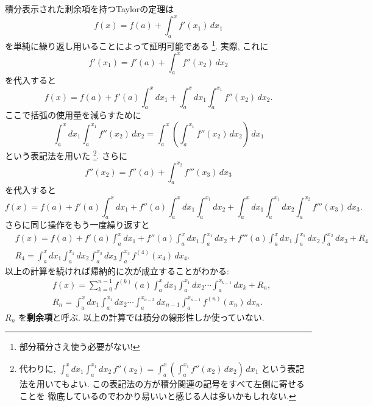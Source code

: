 \documentclass[12pt,twoside]{jarticle}
\theoremstyle{jplain}
\theoremstyle{jplain}
\theoremstyle{jplain}
\numberwithin{theorem}{section}
\numberwithin{equation}{section}
\numberwithin{figure}{section}
\numberwithin{table}{section}
\begin{document}
積分表示された剰余項を持つTaylorの定理は
\[
f(x)=f(a)+\int_a^x f'(x_1)\,dx_1
\]
を単純に繰り返し用いることによって証明可能である%
\footnote{部分積分さえ使う必要がない!}.
実際, これに
\[
f'(x_1)=f'(a)+\int_a^x f''(x_2)\,dx_2
\]
を代入すると
\[
f(x)=f(a)+f'(a) \int_a^x dx_1+\int_a^x dx_1\int_a^{x_1} f''(x_2)\,dx_2.
\]
ここで括弧の使用量を減らすために
\[
\int_a^x dx_1\int_a^{x_1} f''(x_2)\,dx_2
=\int_a^x \left(\int_a^{x_1} f''(x_2)\,dx_2 \right)\,dx_1
\]
という表記法を用いた%
\footnote{代わりに, 
\(\displaystyle
\int_a^x dx_1\int_a^{x_1}dx_2\, f''(x_2)
=\int_a^x \left(\int_a^{x_1} f''(x_2)\,dx_2 \right)\,dx_1
\)
という表記法を用いてもよい.
この表記法の方が積分関連の記号をすべて左側に寄せることを
徹底しているのでわかり易いいと感じる人は多いかもしれない.}.
さらに
\[
f''(x_2)=f''(a)+\int_a^{x_2} f'''(x_3)\,dx_3
\]
を代入すると
\[
f(x)=f(a)+f'(a)\int_a^x\!\!\!dx_1+f''(a)\int_a^x\!\!\!dx_1\int_a^{x_1}\!\!\!dx_2
+\int_a^x\!\!\!dx_1\int_a^{x_1}\!\!\!dx_2\int_a^{x_2}f'''(x_3)\,dx_3.
\]
さらに同じ操作をもう一度繰り返すと
\begin{align*}
&
f(x)=f(a)+f'(a)\int_a^x\!\!\!dx_1+f''(a)\int_a^x\!\!\!dx_1\int_a^{x_1}\!\!\!dx_2
+f'''(a)\int_a^x\!\!\!dx_1\int_a^{x_1}\!\!\!dx_2\int_a^{x_2}\!\!\!dx_3 +R_4
\\ &
R_4 = \int_a^x\!\!\!dx_1\int_a^{x_1}\!\!\!dx_2\int_a^{x_3}\!\!\!dx_3\int_a^{x_3}f^{(4)}(x_4)\,dx_4.
\end{align*}
以上の計算を続ければ帰納的に次が成立することがわかる:
\begin{align*}
&
f(x)=\sum_{k=0}^{n-1} f^{(k)}(a)\int_a^x\!\!\!dx_1\int_a^{x_1}\!\!\!dx_2\cdots\!\!\int_a^{x_{k-1}}\!\!\!dx_k + R_n,
\\ &
R_n=\int_a^x\!\!\!dx_1\int_a^{x_1}\!\!\!dx_2\cdots\int_a^{x_{n-2}}\!\!\!dx_{n-1}\int_a^{x_{n-1}}f^{(n)}(x_n)\,dx_n.
\end{align*}
$R_n$ を{\bf 剰余項}と呼ぶ.
以上の計算では積分の線形性しか使っていない.
\end{document}
